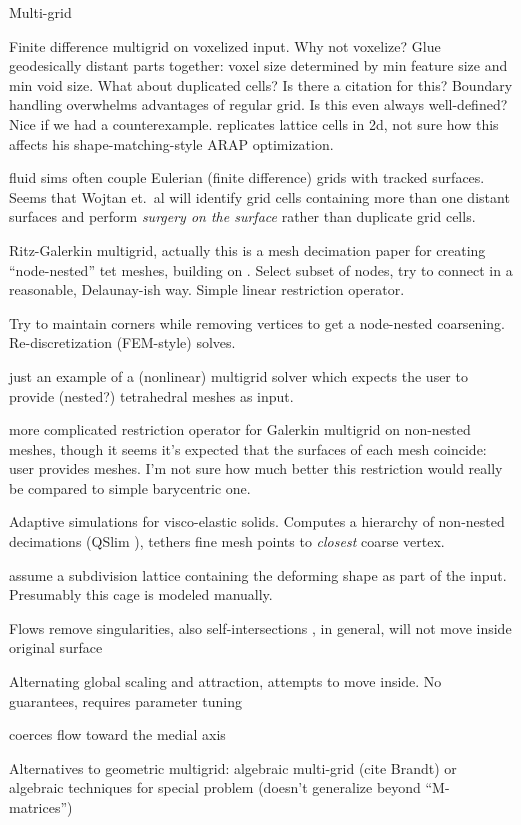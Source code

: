 Multi-grid 


\cite{McAdams:2011} Finite difference multigrid on voxelized input. Why not
voxelize? Glue geodesically distant parts together: voxel size determined by
min feature size and min void size. What about duplicated cells? Is there a
citation for this? Boundary handling overwhelms advantages of regular grid. Is
this even always well-defined? Nice if we had a counterexample.
\cite{Sykora09} replicates lattice cells in 2d, not sure how this affects his
shape-matching-style ARAP optimization.

\cite{wojtan2011liquid} fluid sims often couple Eulerian (finite difference)
grids with tracked surfaces. Seems that Wojtan et.\ al will identify grid cells
containing more than one distant surfaces and perform \emph{surgery on the
surface} rather than duplicate grid cells.

\cite{Adams:1999:PMS} Ritz-Galerkin multigrid, actually this is a mesh
decimation paper for creating ``node-nested'' tet meshes, building on
\cite{guillard1993}. Select subset of nodes, try to connect in a reasonable,
Delaunay-ish way. Simple linear restriction operator.

\cite{Brune:2011} Try to maintain corners while removing vertices to get a
node-nested coarsening.  Re-discretization (FEM-style) solves.

\cite{fish1995efficient} just an example of a (nonlinear) multigrid solver
which expects the user to provide (nested?) tetrahedral meshes as input.

\cite{feng1997non} more complicated restriction operator for Galerkin multigrid
on non-nested meshes, though it seems it's expected that the surfaces of each
mesh coincide: user provides meshes. I'm not sure how much better this
restriction would really be compared to simple barycentric one.

\cite{Debunne:2001:DRD} 
Adaptive simulations for visco-elastic solids. Computes a hierarchy of
non-nested decimations (QSlim \cite{Garland:1997:SSU}), tethers fine mesh
points to \emph{closest} coarse vertex.

\cite{CGCDP:2002} assume a subdivision lattice containing the deforming shape
as part of the input. Presumably this cage is modeled manually.

Flows
\cite{Kazhdan2012} remove singularities, also self-intersections
\cite{Sacht:SIV:2013}, in general, will not move inside original surface

Alternating global scaling and attraction, attempts to move inside. No
guarantees, requires parameter tuning \cite{Wang:2008}

\cite{Tagliasacchi:2012:MCS} coerces flow toward the medial axis

Alternatives to geometric multigrid: algebraic multi-grid (cite Brandt) or
algebraic techniques for special problem \cite{Krishnan:2013:EPL} (doesn't
generalize beyond ``M-matrices'')


